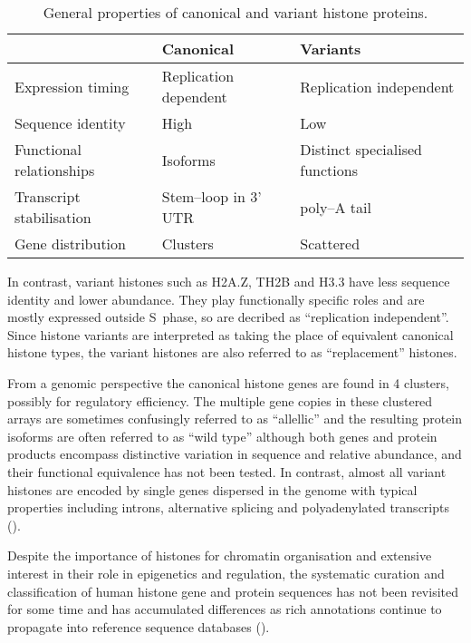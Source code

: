 \begin{table*}[hp]
	\caption{General properties of canonical and variant histone proteins.}
	\label{tab:typical-histone-differences}
	\centering
	\begin{tabular}{l l l}
		\toprule
		\null			     & Canonical             & Variants \\
		\midrule
		Expression timing         & Replication dependent & Replication independent \\
		Sequence identity         & High			  & Low \\
		Functional relationships  & Isoforms              & Distinct specialised functions \\
		Transcript stabilisation  & Stem--loop in 3' UTR  & poly--A tail \\
		Gene distribution         & Clusters              & Scattered \\
	\bottomrule
	\end{tabular}
\end{table*}

	In contrast, variant histones such as H2A.Z, TH2B and H3.3 have 
	less sequence identity and lower abundance. 
	They play functionally specific roles and are mostly expressed outside S~phase, 
	so are decribed as ``replication independent''. 
	Since histone variants are interpreted as taking the place of equivalent canonical histone types, 
	the variant histones are also referred to as ``replacement'' histones.

	From a genomic perspective the canonical histone genes are found in 4 clusters, 
	possibly for regulatory efficiency. 
	The multiple gene copies in these clustered arrays are sometimes confusingly referred to as ``allellic'' 
	and the resulting protein isoforms are often referred to as ``wild type'' 
	although both genes and protein products encompass distinctive variation in sequence and relative abundance, 
	and their functional equivalence has not been tested.
	In contrast, almost all variant histones are encoded by single genes dispersed in the genome 
	with typical properties including introns, alternative splicing 
	and polyadenylated transcripts ().

	Despite the importance of histones for chromatin organisation and extensive interest
	in their role in epigenetics and regulation, the systematic curation and classification of human histone
	gene and protein sequences has not been revisited for some time \citep{Marzluff02}
	and has accumulated  differences
	as rich annotations continue to propagate into reference sequence databases ().

